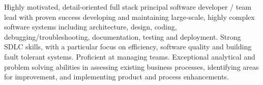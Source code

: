 

\begin{cvparagraph}

Highly motivated, detail-oriented full stack principal software developer / team lead with proven success developing and maintaining large-scale, highly complex software systems including architecture, design, coding, debugging/troubleshooting, documentation, testing and deployment. Strong SDLC skills, with a particular focus on efficiency, software quality and building fault tolerant systems.  Proficient at managing teams.  Exceptional analytical and problem solving abilities in assessing existing business processes, identifying areas for improvement, and implementing product and process enhancements.
\end{cvparagraph}
